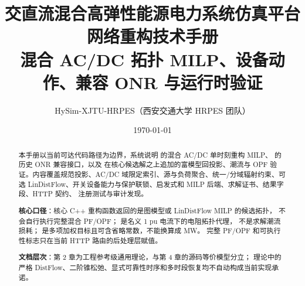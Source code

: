 \documentclass[UTF8,fontset=fandol,a4paper,11pt]{ctexart}
\title{\textbf{交直流混合高弹性能源电力系统仿真平台}\\[0.5em]
       {\Large 网络重构技术手册}\\[0.3em]
       {\large 混合 AC/DC 拓扑 MILP、设备动作、兼容 ONR 与运行时验证}}
\author{HySim-XJTU-HRPES（西安交通大学 HRPES 团队）}
\date{\today}
\begin{document}
\maketitle
\begin{abstract}
\noindent 本手册以当前可达代码路径为边界，系统说明
 的混合 AC/DC 单时刻重构 MILP、
 的历史 ONR 兼容接口，以及
 在核心候选解之上追加的富模型回投影、潮流与 OPF
验证。内容覆盖规范投影、AC/DC 域限定索引、源与负荷聚合、统一/分域辐射约束、可选
LinDistFlow、开关设备能力与保护联锁、启发式和 MILP 后端、求解证书、结果字段、HTTP 契约、
注册测试与审计发现。

\smallskip
\noindent\textbf{核心口径}：核心 C++ 重构函数返回的是图模型或 LinDistFlow MILP 的候选拓扑，
不会自行执行完整混合 PF/OPF； 是名义 1 pu 电流下的电阻拓扑代理，
不是求解潮流损耗； 是多项加权目标且可含省略常数，不能换算成 MW。
完整 PF/OPF 和可执行性标志只在当前 HTTP 路由的后处理层赋值。

\smallskip
\noindent\textbf{文档层次}：第 2 章为工程参考级通用理论，与第 4 章的源码等价模型分立；
理论中的严格 DistFlow、二阶锥松弛、显式可靠性时序和多时段恢复均不自动构成当前实现承诺。
\end{abstract}

\tableofcontents
\newpage












\end{document}
